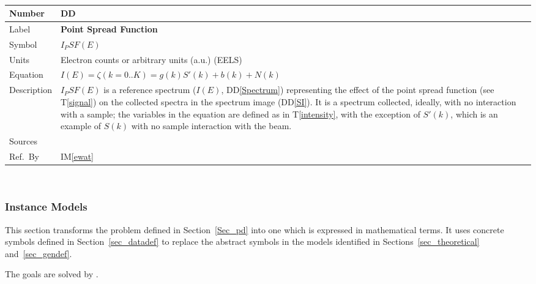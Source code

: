 \documentclass[12pt]{article}
\newcommand{\colAwidth}{0.13\textwidth}
\newcommand{\colBwidth}{0.82\textwidth}
\newcounter{defnum} %
\newcounter{datadefnum} %
\newcommand{\ddref}[1]{DD\ref{#1}}
\newcommand{\tref}[1]{T\ref{#1}}
\newcommand{\iref}[1]{IM\ref{#1}}
\begin{document}
~\newline

\noindent
\begin{minipage}{\textwidth}
	\renewcommand*{\arraystretch}{1.5}
	\begin{tabular}{| p{\colAwidth} | p{\colBwidth}|}
		\hline
		\rowcolor[gray]{0.9}
		Number& DD{datadefnum}\thedatadefnum \label{PSF}\\
		\hline
		Label& \bf Point Spread Function\\
		\hline
		Symbol &$I_PSF(E)$\\
		\hline
		Units & Electron counts or arbitrary units (a.u.) (EELS)\\
		  \hline
		  Equation&$I(E) = \zeta(k={0..K}) = g(k) S'(k) + b(k) + N(k)$\\
		  \hline
		  Description & 
		               $I_PSF(E)$ is a reference spectrum ($I(E)$, \ddref{Spectrum}) representing the effect of the point spread function (see \tref{signal}) on the collected spectra in the spectrum image (\ddref{SI}). It is a spectrum collected, ideally, with no interaction with a sample; the variables in the equation are defined as in \tref{intensity}, with the exception of $S'(k)$, which is an example of $S(k)$ with no sample interaction with the beam.
		  \\
		  \hline
		  Sources&~\cite{zuo_electron_2000, jeanguillaume_spectrum-image:_1989, gloter_improving_2003}  \\
		  \hline
		  Ref.\ By & \iref{ewat}\\
		  \hline
	\end{tabular}
\end{minipage}\\

\subsubsection{Instance Models} \label{sec_instance}    

This section transforms the problem defined in Section~\ref{Sec_pd} into 
one which is expressed in mathematical terms. It uses concrete symbols defined 
in Section~\ref{sec_datadef} to replace the abstract symbols in the models 
identified in Sections~\ref{sec_theoretical} and~\ref{sec_gendef}.

The goals  are solved by .  
\end{document}
